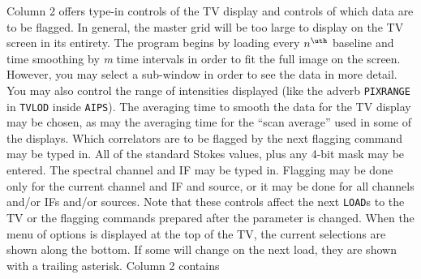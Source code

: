      Column 2 offers type-in controls of the TV display and controls
of which data are to be flagged.  In general, the master grid will be
too large to display on the TV screen in its entirety.  The program
begins by loading every $n^{\uth}$ baseline and time smoothing by {\it
m\/} time intervals in order to fit the full image on the screen.
However, you may select a sub-window in order to see the data in more
detail. You may also control the range of intensities displayed (like
the adverb {\tt PIXRANGE} in {\tt TVLOD} inside \hbox{{\tt AIPS}}).
The averaging time to smooth the data for the TV display may be
chosen, as may the averaging time for the ``scan average'' used in
some of the displays.  Which correlators are to be flagged by the next
flagging command may be typed in.  All of the standard Stokes values,
plus any 4-bit mask may be entered.  The spectral channel and IF may
be typed in.  Flagging may be done only for the current channel and IF
and source, or it may be done for all channels and/or IFs and/or
sources.  Note that these controls affect the next {\tt LOAD}s to the
TV or the flagging commands prepared after the parameter is changed.
When the menu of options is displayed at the top of the TV, the
current selections are shown along the bottom.  If some will change on
the next load, they are shown with a trailing asterisk.  Column 2
contains
